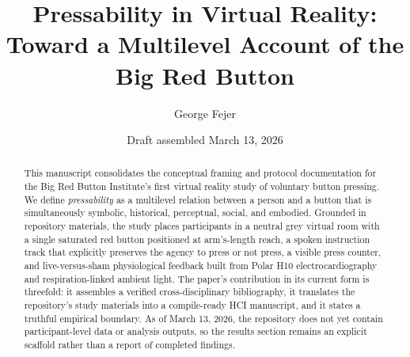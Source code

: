 \documentclass[12pt,a4paper]{article}
\title{Pressability in Virtual Reality:\\Toward a Multilevel Account of the Big Red Button}
\author{George Fejer}
\date{Draft assembled March 13, 2026}
\begin{document}
\maketitle

\begin{abstract}
This manuscript consolidates the conceptual framing and protocol documentation for the Big Red Button Institute's first virtual reality study of voluntary button pressing. We define \emph{pressability} as a multilevel relation between a person and a button that is simultaneously symbolic, historical, perceptual, social, and embodied. Grounded in repository materials, the study places participants in a neutral grey virtual room with a single saturated red button positioned at arm's-length reach, a spoken instruction track that explicitly preserves the agency to press or not press, a visible press counter, and live-versus-sham physiological feedback built from Polar H10 electrocardiography and respiration-linked ambient light. The paper's contribution in its current form is threefold: it assembles a verified cross-disciplinary bibliography, it translates the repository's study materials into a compile-ready HCI manuscript, and it states a truthful empirical boundary. As of March 13, 2026, the repository does not yet contain participant-level data or analysis outputs, so the results section remains an explicit scaffold rather than a report of completed findings.
\end{abstract}









\end{document}
